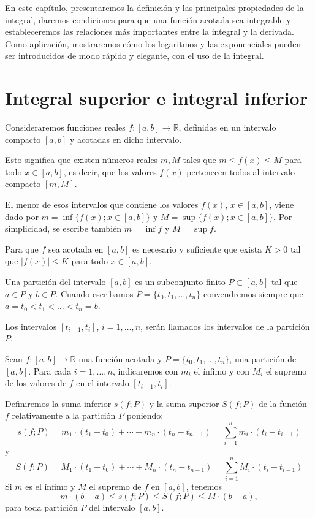 \documentclass[12pt,oneside]{book}
\begin{document}
En este capítulo, presentaremos la definición y las principales propiedades de la integral, daremos condiciones para que una función acotada sea integrable y estableceremos las relaciones más importantes entre la integral y la derivada. Como aplicación, mostraremos cómo los logaritmos y las exponenciales pueden ser introducidos de modo rápido y elegante, con el uso de la integral.

\section{Integral superior e integral inferior}

Consideraremos funciones reales \(f: [a, b] \to \mathbb{R}\), definidas en un intervalo compacto \([a, b]\) y acotadas en dicho intervalo.

Esto significa que existen números reales \(m, M\) tales que \(m \le f(x) \le M\) para todo \(x \in [a, b]\), es decir, que los valores \(f(x)\) pertenecen todos al intervalo compacto \([m, M]\).

El menor de esos intervalos que contiene los valores \(f(x)\), \(x \in [a, b]\), viene dado por \(m = \inf\{f(x); x \in [a, b]\}\) y \(M = \sup\{f(x); x \in [a, b]\}\). Por simplicidad, se escribe también \(m = \inf f\) y \(M = \sup f\).

Para que \(f\) sea acotada en \([a, b]\) es necesario y suficiente que exista \(K > 0\) tal que \(|f(x)| \le K\) para todo \(x \in [a, b]\).

Una partición del intervalo \([a, b]\) es un subconjunto finito \(P \subset [a, b]\) tal que \(a \in P\) y \(b \in P\). Cuando escribamos \(P = \{t_0, t_1, \dots, t_n\}\) convendremos siempre que \(a = t_0 < t_1 < \dots < t_n = b\).

Los intervalos \([t_{i-1}, t_i]\), \(i = 1, \ldots, n\), serán llamados los intervalos de la partición \(P\).

Sean \(f: [a, b] \to \mathbb{R}\) una función acotada y \(P = \{t_0, t_1, \ldots, t_n\}\), una partición de \([a, b]\). Para cada \(i = 1, \ldots, n\), indicaremos con \(m_i\) el ínfimo y con \(M_i\) el supremo de los valores de \(f\) en el intervalo \([t_{i-1}, t_i]\).

Definiremos la suma inferior \(s(f; P)\) y la suma superior \(S(f; P)\) de la función \(f\) relativamente a la partición \(P\) poniendo:
\[s(f; P) = m_1 \cdot (t_1 - t_0) + \cdots + m_n \cdot (t_n - t_{n-1}) = \sum_{i=1}^n m_i \cdot (t_i - t_{i-1})\]
y
\[S(f; P) = M_1 \cdot (t_1 - t_0) + \cdots + M_n \cdot (t_n - t_{n-1}) = \sum_{i=1}^n M_i \cdot (t_i - t_{i-1})\]
Si \(m\) es el ínfimo y \(M\) el supremo de \(f\) en \([a, b]\), tenemos
\[m \cdot (b - a) \leq s(f; P) \leq S(f; P) \leq M \cdot (b - a),\]
para toda partición \(P\) del intervalo \([a, b]\).
\end{document}
